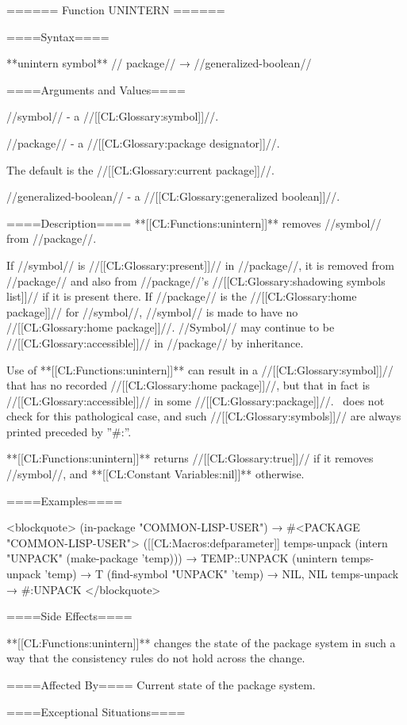 ====== Function UNINTERN ======

====Syntax====

**unintern {symbol** //\opt} package// → //generalized-boolean//

====Arguments and Values====

//symbol// - a //[[CL:Glossary:symbol]]//.

//package// - a //[[CL:Glossary:package designator]]//.

The default is the //[[CL:Glossary:current package]]//.

//generalized-boolean// - a //[[CL:Glossary:generalized boolean]]//.

====Description==== **[[CL:Functions:unintern]]** removes //symbol// from //package//.

If //symbol// is //[[CL:Glossary:present]]// in //package//, it is removed from //package// and also from //package//'s //[[CL:Glossary:shadowing symbols list]]// if it is present there. If //package// is the //[[CL:Glossary:home package]]// for //symbol//, //symbol// is made to have no //[[CL:Glossary:home package]]//. //Symbol// may continue to be //[[CL:Glossary:accessible]]// in //package// by inheritance.

Use of **[[CL:Functions:unintern]]** can result in a //[[CL:Glossary:symbol]]// that has no recorded //[[CL:Glossary:home package]]//, but that in fact is //[[CL:Glossary:accessible]]// in some //[[CL:Glossary:package]]//. \clisp\ does not check for this pathological case, and such //[[CL:Glossary:symbols]]// are always printed preceded by ''#:''.

**[[CL:Functions:unintern]]** returns //[[CL:Glossary:true]]// if it removes //symbol//, and **[[CL:Constant Variables:nil]]** otherwise.

====Examples====

<blockquote> (in-package "COMMON-LISP-USER") → #<PACKAGE "COMMON-LISP-USER"> ([[CL:Macros:defparameter]] temps-unpack (intern "UNPACK" (make-package 'temp))) → TEMP::UNPACK (unintern temps-unpack 'temp) → T (find-symbol "UNPACK" 'temp) → NIL, NIL temps-unpack → #:UNPACK </blockquote>

====Side Effects====

**[[CL:Functions:unintern]]** changes the state of the package system in such a way that the consistency rules do not hold across the change.

====Affected By==== Current state of the package system.

====Exceptional Situations====

